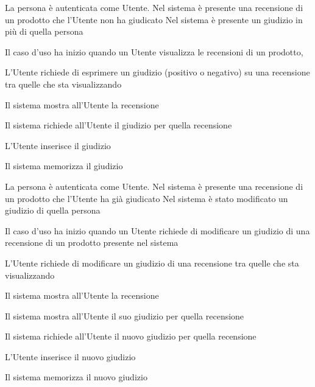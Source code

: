 {}
{La persona è autenticata come Utente. Nel sistema è presente una recensione di un prodotto che l'Utente non ha giudicato}
{Nel sistema è presente un giudizio in più di quella persona}
{\begin{enumCU}
	\item Il caso d'uso ha inizio quando un Utente visualizza le recensioni di un prodotto, 
	\item L'Utente richiede di esprimere un giudizio (positivo o negativo) su una recensione tra quelle che sta visualizzando
	\item Il sistema mostra all'Utente la recensione
	\item Il sistema richiede all'Utente il giudizio per quella recensione
	\item L'Utente inserisce il giudizio
	\item Il sistema memorizza il giudizio
\end{enumCU}}


{}
{La persona è autenticata come Utente. Nel sistema è presente una recensione di un prodotto che l'Utente ha già giudicato}
{Nel sistema è stato modificato un giudizio di quella persona}
{\begin{enumCU}
	\item Il caso d'uso ha inizio quando un Utente richiede di modificare un giudizio di una recensione di un prodotto presente nel sistema
	\item L'Utente richiede di modificare un giudizio di una recensione tra quelle che sta visualizzando
	\item Il sistema mostra all'Utente la recensione
	\item Il sistema mostra all'Utente il suo giudizio per quella recensione
	\item Il sistema richiede all'Utente il nuovo giudizio per quella recensione
	\item L'Utente inserisce il nuovo giudizio
	\item Il sistema memorizza il nuovo giudizio
\end{enumCU}}


